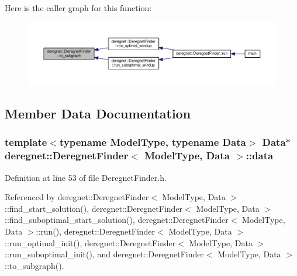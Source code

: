 Here is the caller graph for this function\+:
\nopagebreak
\begin{figure}[H]
\begin{center}
\leavevmode
\includegraphics[width=350pt]{classderegnet_1_1DeregnetFinder_a681d5e2506f9b6075ab36e742a360328_icgraph}
\end{center}
\end{figure}




\subsection{Member Data Documentation}
\subsubsection[{\texorpdfstring{data}{data}}]{\setlength{\rightskip}{0pt plus 5cm}template$<$typename Model\+Type, typename Data$>$ {\bf Data}$\ast$ {\bf deregnet\+::\+Deregnet\+Finder}$<$ Model\+Type, {\bf Data} $>$\+::data\hspace{0.3cm}{\ttfamily [private]}}\hypertarget{classderegnet_1_1DeregnetFinder_ab158f2a6bb7f39ed3d6e4a9ffe568232}{}\label{classderegnet_1_1DeregnetFinder_ab158f2a6bb7f39ed3d6e4a9ffe568232}


Definition at line 53 of file Deregnet\+Finder.\+h.



Referenced by deregnet\+::\+Deregnet\+Finder$<$ Model\+Type, Data $>$\+::find\+\_\+start\+\_\+solution(), deregnet\+::\+Deregnet\+Finder$<$ Model\+Type, Data $>$\+::find\+\_\+suboptimal\+\_\+start\+\_\+solution(), deregnet\+::\+Deregnet\+Finder$<$ Model\+Type, Data $>$\+::run(), deregnet\+::\+Deregnet\+Finder$<$ Model\+Type, Data $>$\+::run\+\_\+optimal\+\_\+init(), deregnet\+::\+Deregnet\+Finder$<$ Model\+Type, Data $>$\+::run\+\_\+suboptimal\+\_\+init(), and deregnet\+::\+Deregnet\+Finder$<$ Model\+Type, Data $>$\+::to\+\_\+subgraph().

